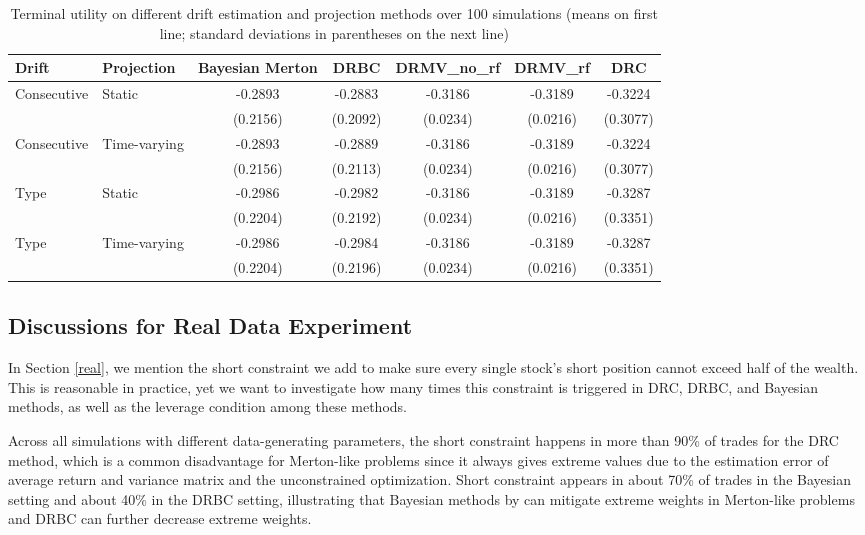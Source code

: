 \documentclass[11pt]{article}
\theoremstyle{definition}
\begin{document}
\begin{table}[htbp]
\centering
\small
\caption{Terminal utility on different drift estimation and projection methods over 100 simulations (means on first line; standard deviations in parentheses on the next line)}
\label{tab:utility}
\begin{tabular}{llccccc}
\toprule
Drift & Projection  & Bayesian Merton & DRBC & DRMV\_no\_rf & DRMV\_rf & DRC \\
\midrule
\multirow{2}{*}{Consecutive} & \multirow{2}{*}{Static} 
  & -0.2893 & -0.2883 & -0.3186 & -0.3189 & -0.3224 \\
 & 
  & (0.2156) & (0.2092) & (0.0234) & (0.0216) & (0.3077) \\
\multirow{2}{*}{Consecutive} & \multirow{2}{*}{Time-varying} 
  & -0.2893 & -0.2889 & -0.3186 & -0.3189 & -0.3224 \\
 & 
  & (0.2156) & (0.2113) & (0.0234) & (0.0216) & (0.3077) \\


\multirow{2}{*}{Type} & \multirow{2}{*}{Static} 
  & -0.2986 & -0.2982 & -0.3186 & -0.3189 & -0.3287 \\
 & 
  & (0.2204) & (0.2192) & (0.0234) & (0.0216) & (0.3351) \\



\multirow{2}{*}{Type} & \multirow{2}{*}{Time-varying} 
  & -0.2986 & -0.2984 & -0.3186 & -0.3189 & -0.3287 \\
 & 
  & (0.2204) & (0.2196) & (0.0234) & (0.0216) & (0.3351) \\


\bottomrule
\end{tabular}
\end{table}


\subsection{Discussions for Real Data Experiment}

In Section \ref{real}, we mention the short constraint we add to make sure every single stock's short position cannot exceed half of the wealth. This is reasonable in practice, yet we want to investigate how many times this constraint is triggered in DRC, DRBC, and Bayesian methods, as well as the leverage condition among these methods. 

Across all simulations with different data-generating parameters, the short constraint happens in more than 90\% of trades for the DRC method, which is a common disadvantage for Merton-like problems since it always gives extreme values due to the estimation error of average return and variance matrix and the unconstrained optimization. Short constraint appears in about 70\% of trades in the Bayesian setting and about 40\% in the DRBC setting, illustrating that Bayesian methods by \cite{KZ98} can mitigate extreme weights in Merton-like problems and DRBC can further decrease extreme weights. 
\end{document}
